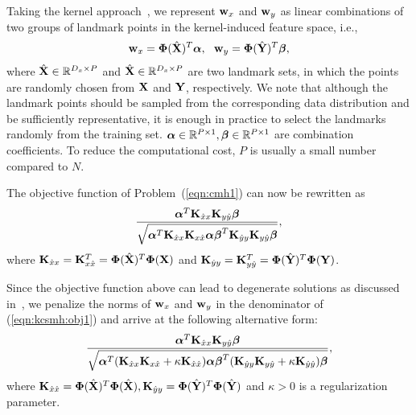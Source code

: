 
Taking the kernel approach~\cite{scholkopf2001colt}\cite{kulis2009nips}, we represent ${\bf w}_{x}$ and ${\bf w}_{y}$ as linear combinations of two groups of landmark points in the kernel-induced feature space, i.e.,
\begin{align}
{\bf w}_{x} = \mbox{\boldmath$\Phi$\unboldmath}(\hat{{\bf X}})^{T}\mbox{\boldmath$\alpha$\unboldmath}, \ \
{\bf w}_{y} = \mbox{\boldmath$\Phi$\unboldmath}(\hat{{\bf Y}})^{T}\mbox{\boldmath$\beta$\unboldmath},\nonumber
\end{align}
where $ \hat{{\bf X}}\in\mathbb{R}^{D_x\times P}$ and $\hat{{\bf X}}\in\mathbb{R}^{D_x\times P} $ are two landmark sets, in which the points are randomly chosen from $ {\bf X} $ and $ {\bf Y}  $, respectively. We note that although the landmark points should be sampled from the corresponding data distribution and be sufficiently representative, it is enough in practice to select the landmarks randomly from the training set. $\mbox{\boldmath$\alpha$\unboldmath}\in\mathbb{R}^{P\times 1},\mbox{\boldmath$\beta$\unboldmath}\in\mathbb{R}^{P\times 1}$ are combination coefficients. To reduce the computational cost, $P$ is usually a small number compared to $N$.

The objective function of Problem~(\ref{eqn:cmh1}) can now be rewritten as
\begin{align}
\frac{\alpp^{T}\K_{\hat{x}x}\K_{y\hat{y}}\bett}{\sqrt{\alpp^{T}\K_{\hat{x}x}\K_{x\hat{x}}\alpp\bett^{T}\K_{\hat{y}y}\K_{y\hat{y}}\bett}},
\label{eqn:kcsmh:obj1}
\end{align}
where ${\bf K}_{\hat{x}x} = {\bf K}_{x\hat{x}}^{T} = \mbox{\boldmath$\Phi$\unboldmath}(\hat{{\bf X}})^{T}\mbox{\boldmath$\Phi$\unboldmath}({\bf X})$ and ${\bf K}_{\hat{y}y} = {\bf K}_{y\hat{y}}^{T} = \mbox{\boldmath$\Phi$\unboldmath}(\hat{{\bf Y}})^{T}\mbox{\boldmath$\Phi$\unboldmath}({\bf Y})$.

Since the objective function above can lead to degenerate solutions as discussed in~\cite{hardoon2004nc}, we penalize the norms of ${\bf w}_{x}$ and ${\bf w}_{y}$ in the denominator of (\ref{eqn:kcsmh:obj1}) and arrive at the following alternative form:
\begin{align}
\frac{\alpp^{T}\K_{\hat{x}x}\K_{y\hat{y}}\bett}{\sqrt{\alpp^{T}(\K_{\hat{x}x}\K_{x\hat{x}}+\kappa\K_{\hat{x}\hat{x}})\alpp\bett^{T}(\K_{\hat{y}y}\K_{y\hat{y}}+\kappa\K_{\hat{y}\hat{y}})\bett}},
\label{eqn:kcsmh:obj2}
\end{align}
where ${\bf K}_{\hat{x}\hat{x}} = \mbox{\boldmath$\Phi$\unboldmath}(\hat{{\bf X}})^{T}\mbox{\boldmath$\Phi$\unboldmath}(\hat{{\bf X}}),{\bf K}_{\hat{y}y}= \mbox{\boldmath$\Phi$\unboldmath}(\hat{{\bf Y}})^{T}\mbox{\boldmath$\Phi$\unboldmath}(\hat{{\bf Y}})$ and $\kappa>0$ is a regularization parameter.
%

